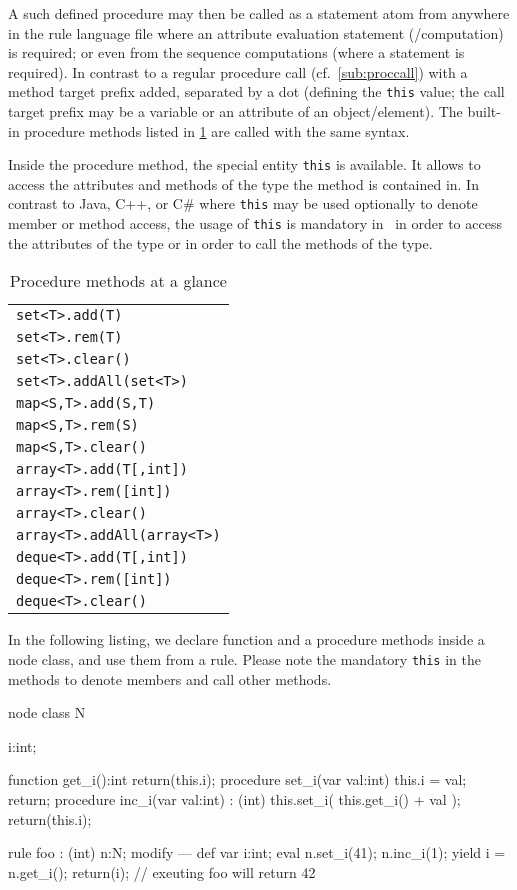 A such defined procedure may then be called as a statement atom from anywhere in the rule language file where an attribute evaluation statement (/computation) is required; or even from the sequence computations (where a statement is required).
In contrast to a regular procedure call (cf.~\ref{sub:proccall}) with a method target prefix added, separated by a dot (defining the \texttt{this} value; the call target prefix may be a variable or an attribute of an object/element).
The built-in procedure methods listed in \ref{procmethstab} are called with the same syntax.

Inside the procedure method, the special entity \texttt{this} is available.
It allows to access the attributes and methods of the type the method is contained in.
In contrast to Java, C++, or C\# where \texttt{this} may be used optionally to denote member or method access,
the usage of \texttt{this} is mandatory in \GrG~in order to access the attributes of the type or in order to call the methods of the type.


\begin{table}[htbp]
\centering
\begin{tabular}{|l|}
\hline
\texttt{set<T>.add(T)}\\
\texttt{set<T>.rem(T)}\\
\texttt{set<T>.clear()}\\
\texttt{set<T>.addAll(set<T>)}\\
\hline
\texttt{map<S,T>.add(S,T)}\\
\texttt{map<S,T>.rem(S)}\\
\texttt{map<S,T>.clear()}\\
\hline
\texttt{array<T>.add(T[,int])}\\
\texttt{array<T>.rem([int])}\\
\texttt{array<T>.clear()}\\
\texttt{array<T>.addAll(array<T>)}\\
\hline
\texttt{deque<T>.add(T[,int])}\\
\texttt{deque<T>.rem([int])}\\
\texttt{deque<T>.clear()}\\
\hline
\end{tabular}
\caption{Procedure methods at a glance}
\label{procmethstab}
\end{table}


\begin{example}
In the following listing, we declare function and a procedure methods inside a node class, and use them from a rule.
Please note the mandatory \texttt{this} in the methods to denote members and call other methods.
	\begin{grgen}
node class N
{
	i:int;
	
	function get_i():int
	{
		return(this.i);
	}
	procedure set_i(var val:int)
	{
		this.i = val;
		return;
	}
	procedure inc_i(var val:int) : (int)
	{
		this.set_i( this.get_i() + val );
		return(this.i);
	}
}

rule foo : (int)
{
	n:N;
	modify {
	---
		def var i:int;
		eval {
			n.set_i(41);
			n.inc_i(1);
			yield i = n.get_i();
		}
		return(i); // exeuting foo will return 42
	}
}
	\end{grgen}
\end{example}


